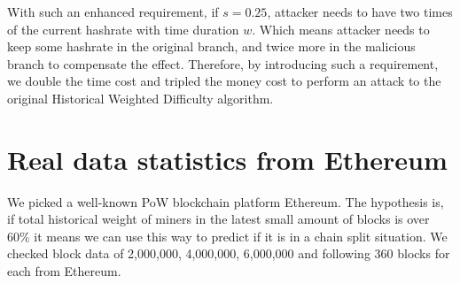 \documentclass[conference]{IEEEtran}
\begin{document}
With such an enhanced requirement, if $s=0.25$, attacker needs to have two times of the current hashrate with time duration $w$. Which means attacker needs to keep some hashrate in the original branch, and twice more in the malicious branch to compensate the effect. Therefore, by introducing such a requirement, we double the time cost and tripled the money cost to perform an attack to the original Historical Weighted Difficulty algorithm.

\section{Real data statistics from Ethereum}

We picked a well-known PoW blockchain platform Ethereum. The hypothesis is, if total historical weight of miners in the latest small amount of blocks is over 60\% it means we can use this way to predict if it is in a chain split situation. We checked block data of 2,000,000, 4,000,000, 6,000,000 and following 360 blocks for each from Ethereum.
\end{document}
